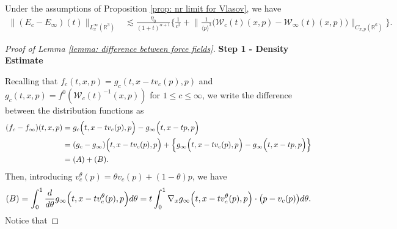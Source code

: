 \documentclass[10pt,a4paper]{amsart}
\begin{document}
\begin{lemma}\label{lemma: difference between force fields}
Under the assumptions of Proposition \ref{prop: nr limit for Vlasov}, we have
$$\begin{aligned}
\|(E_c-E_\infty)(t)\|_{L_x^\infty(\mathbb{R}^3)}&\lesssim\frac{\eta_0}{(1+t)^{\alpha+1}}\bigg\{\frac{1}{c^2}+\Big\|\frac{1}{\langle p\rangle^3}\Big(\mathcal{W}_c(t)(x,p)-\mathcal{W}_\infty(t)(x,p)\Big)\Big\|_{C_{x,p}(\mathbb{R}^6)}\bigg\}.
\end{aligned}$$
\end{lemma}

\begin{proof}[Proof of Lemma \ref{lemma: difference between force fields}]
\textbf{Step 1 - Density Estimate}

\noindent Recalling that $f_c(t,x,p)=g_c(t,x-tv_c(p),p)$ and 
$g_c(t,x,p)=f^0(\mathcal{W}_c(t)^{-1}(x,p))$ for $1\leq c\leq\infty$, we write the difference between the distribution functions as 
$$\begin{aligned}
(f_c-f_\infty)(t,x,p)&=g_c\Big(t,x-tv_c(p),p\Big)-g_\infty\Big(t,x-tp,p\Big)\\
&=(g_c-g_\infty)\Big(t,x-tv_c(p),p\Big)+\Big\{g_\infty\Big(t,x-tv_c(p),p\Big)-g_\infty\Big(t,x-tp,p\Big)\Big\}\\
&=\textup{(A)}+\textup{(B)}.
\end{aligned}$$
Then, introducing $v_c^\theta(p)=\theta v_c(p)+(1-\theta)p$, we have 
$$\textup{(B)}=\int_0^1 \frac{d}{d\theta}g_\infty\Big(t,x-tv_c^\theta(p),p\Big)d\theta=t\int_0^1 \nabla_xg_\infty\Big(t,x-tv_c^\theta(p),p\Big)\cdot\big(p-v_c(p)\big)d\theta.$$
Notice that

\end{proof}
\end{document}
